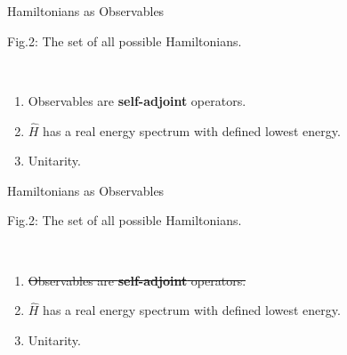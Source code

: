 \documentclass[10pt]{beamer}
\begin{document}
\begin{frame}{Hamiltonians as Observables}
    \\
    \hspace{1em}
    \begin{tiny}
        Fig.2: The set of all possible Hamiltonians.
    \end{tiny}
    \\
    \begin{enumerate}
        \item \textcolor{myNewColorA}{Observables are \textbf{self-adjoint} operators.}
        \item \textcolor{myNewColorC}{$\hat{H}$ has a real energy spectrum with defined lowest energy.}
        \item \textcolor{myNewColorC}{Unitarity.}
    \end{enumerate}
\end{frame}


\begin{frame}{Hamiltonians as Observables}
    \\
    \hspace{1em}
    \begin{tiny}
        Fig.2: The set of all possible Hamiltonians.
    \end{tiny}
    \\
    \begin{enumerate}
        \item \textcolor{myNewColorA}{\st{Observables are \textbf{self-adjoint} operators.}}
        \item \textcolor{myNewColorC}{$\hat{H}$ has a real energy spectrum with defined lowest energy.}
        \item \textcolor{myNewColorC}{Unitarity.}
    \end{enumerate}
\end{frame}
\end{document}
